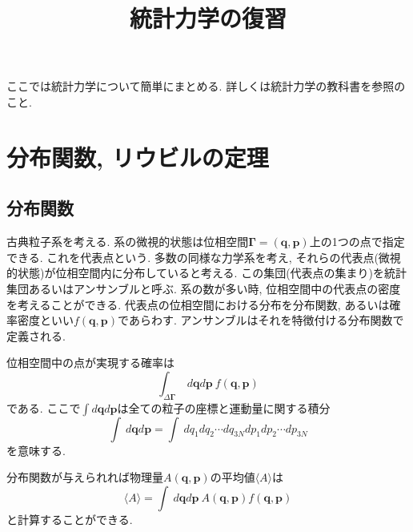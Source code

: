 





\title{統計力学の復習}
\maketitle

ここでは統計力学について簡単にまとめる.
詳しくは統計力学の教科書を参照のこと\cite{1978Toda, 1998Kubo, Goldstein1, Goldstein2,Tuckerman}.

\section{分布関数, リウビルの定理}
\subsection{分布関数}
古典粒子系を考える.
系の微視的状態は位相空間$\bm{\Gamma} = (\bm{q}, \bm{p})$上の1つの点で指定できる.
これを代表点という.
多数の同様な力学系を考え, それらの代表点(微視的状態)が位相空間内に分布していると考える.
この集団(代表点の集まり)を統計集団あるいはアンサンブルと呼ぶ.
系の数が多い時, 位相空間中の代表点の密度を考えることができる.
代表点の位相空間における分布を分布関数, あるいは確率密度といい$f(\bm{q}, \bm{p})$であらわす.
アンサンブルはそれを特徴付ける分布関数で定義される.

位相空間中の点が実現する確率は
\begin{equation}
 \int_{\Delta \bm{\Gamma}}~ d\bm{q} d\bm{p}~ f(\bm{q}, \bm{p})
\end{equation}
である.
ここで$\int d\bm{q} d\bm{p}$は全ての粒子の座標と運動量に関する積分
\begin{equation}
 \int~ d\bm{q} d\bm{p}
=\int~ dq_{1}dq_{2} \cdots dq_{3N}dp_{1}dp_{2} \cdots dp_{3N}
\end{equation}
を意味する.

分布関数が与えられれば物理量$A(\bm{q}, \bm{p})$の平均値$\langle A \rangle$は
\begin{equation}
 \langle A \rangle
=\int~ d\bm{q} d\bm{p}~ A(\bm{q}, \bm{p}) f(\bm{q}, \bm{p})
\end{equation}
と計算することができる.

